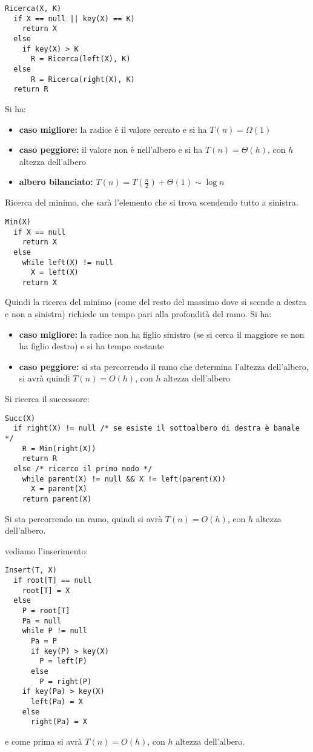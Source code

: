 \documentclass[a4paper,12pt,oneside,tikz]{book}
\begin{document}
\begin{esempio}
\begin{verbatim}
Ricerca(X, K)
  if X == null || key(X) == K)
    return X
  else
    if key(X) > K
      R = Ricerca(left(X), K)
  else
      R = Ricerca(right(X), K)
  return R
\end{verbatim}
Si ha:
\begin{itemize}
\item \textbf{caso migliore:} la radice è il valore cercato e si ha $T(n)=\Omega(1)$
\item \textbf{caso peggiore:} il valore non è nell'albero e si ha $T(n)=\Theta(h)$, con $h$ altezza dell'albero
\item \textbf{albero bilanciato:} $T(n)=T\left(\frac{n}{2}\right)+\Theta(1)\sim\log n$
\end{itemize}
\end{esempio}
\begin{esempio}
Ricerca del minimo, che sarà l'elemento che si trova scendendo tutto a sinistra.
\begin{verbatim}
Min(X)
  if X == null
    return X
  else
    while left(X) != null
      X = left(X)
    return X
\end{verbatim}
Quindi la ricerca del minimo (come del resto del massimo dove si scende a destra e non a sinistra) richiede un tempo pari alla profondità del ramo. Si ha:
\begin{itemize}
\item \textbf{caso migliore:} la radice non ha figlio sinistro (se si cerca il maggiore se non ha figlio destro) e si ha tempo costante
\item \textbf{caso peggiore:} si sta percorrendo il ramo che determina l'altezza dell'albero, si avrà quindi $T(n)=O(h)$, con $h$ altezza dell'albero

\end{itemize}
\end{esempio}
\begin{esempio}
Si ricerca il successore:
\begin{verbatim}
Succ(X)
  if right(X) != null /* se esiste il sottoalbero di destra è banale */
    R = Min(right(X))
    return R
  else /* ricerco il primo nodo */
    while parent(X) != null && X != left(parent(X))
      X = parent(X)
    return parent(X)
\end{verbatim}
Si sta percorrendo un ramo, quindi si avrà $T(n)=O(h)$, con $h$ altezza dell'albero.
\end{esempio}
\begin{esempio}
vediamo l'inserimento:
\begin{verbatim}
Insert(T, X)
  if root[T] == null
    root[T] = X
  else
    P = root[T]
    Pa = null
    while P != null
      Pa = P
      if key(P) > key(X)
        P = left(P)
      else
        P = right(P)
    if key(Pa) > key(X)
      left(Pa) = X
    else
      right(Pa) = X
\end{verbatim}
e come prima si avrà $T(n)=O(h)$, con $h$ altezza dell'albero.
\end{esempio}
\end{document}
